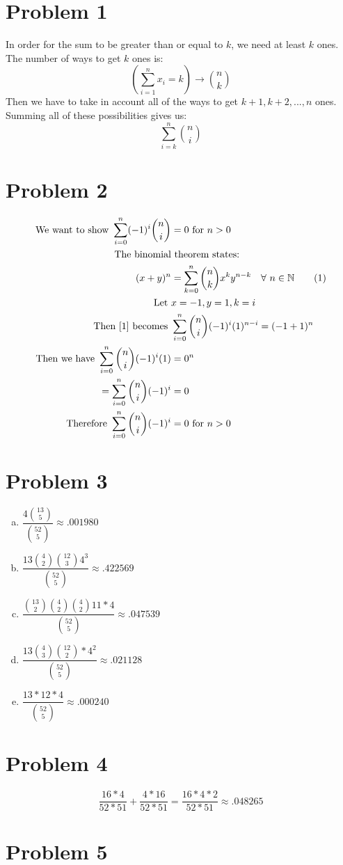 \documentclass{article}
\begin{document}
\begin{flushleft}
\section*{Problem 1}
In order for the sum to be greater than or equal to $k$, we need at least $k$ ones. The number of ways to get $k$ ones is:
\[\left(\sum \limits_{i=1}^{n}x_i=k\right) \to {n \choose k}
\]
Then we have to take in account all of the ways to get $k+1,k+2,...,n$ ones.\\
Summing all of these possibilities gives us:
\[\sum \limits_{i=k}^{n}{n \choose i}
\]
\section*{Problem 2}
\begin{align*}
\text{We want to show } \sum \limits_{i=0}^{n}(-1)^i{n \choose i}&=0 \text{ for } n>0 \\
\text{The binomial}& \text{ theorem states:}\\
(x+y)^n&=\sum \limits_{k=0}^{n}{n \choose k}x^k y^{n-k} \quad \forall \ n\in \mathbb{N}  \label{1}\tag{1}\\
\text{Let }& x=-1, y=1, k=i\\
\text{Then } \eqref{1} \text{ becomes }& \sum \limits_{i=0}^{n}{n \choose i}(-1)^i(1)^{n-i}=(-1+1)^n\\
\text{Then we have } \sum \limits_{i=0}^{n}{n \choose i}(-1)^i(1)&=0^n\\
=\sum \limits_{i=0}^{n}{n \choose i}(-1)^i&=0\\
\text{Therefore }
\sum \limits_{i=0}^{n}{n \choose i}(-1)^{i}&=0 \text{ for } n>0
\end{align*}
\pagebreak
\section*{Problem 3}
\begin{enumerate}[(a)]
\item $\dfrac{4{13\choose 5}}{{52\choose 5}} \approx .001980$ \\
\item $\dfrac{13{4\choose 2}{12 \choose 3}4^3}{{52\choose 5}} \approx .422569$\\
\item $\dfrac{{13 \choose 2}{4\choose 2}{4\choose 2}11*4}{{52\choose 5}}\approx .047539$\\
\item $\dfrac{13{4\choose 3}{12 \choose 2}*4^2}{{52\choose 5}}\approx .021128$\\
\item $\dfrac{13*12*4}{{52\choose 5}}\approx .000240$
\end{enumerate}
\pagebreak
\section*{Problem 4}
\[\dfrac{16*4}{52*51}+\dfrac{4*16}{52*51} = \dfrac{16*4*2}{52*51} \approx .048265
\]
\section*{Problem 5}

\end{flushleft}
\end{document}
